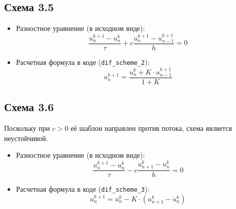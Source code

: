 \subsection{Схема 3.5}

\begin{itemize}
    \item[] {Разностное уравнение (в исходном виде):}
    \begin{equation*}
        \frac{u_{n}^{k+1} - u_{n}^{k}}{\tau} + c \frac{u_{n}^{k+1} - u_{n-1}^{k+1}}{h} = 0
    \end{equation*}
    
    \item[] {Расчетная формула в коде (\texttt{dif\_scheme\_2}):}
    \begin{equation*}
        u_{n}^{k+1} = \frac{u_{n}^{k} + K \cdot u_{n-1}^{k+1}}{1 + K}
    \end{equation*}
\end{itemize}

\subsection{Схема 3.6}
Поскольку при $c > 0$ её шаблон направлен против потока, схема является  неустойчивой.

\begin{itemize}
    \item[] {Разностное уравнение (в исходном виде):}
    \begin{equation*}
        \frac{u_{n}^{k+1} - u_{n}^{k}}{\tau} - c \frac{u_{n+1}^{k} - u_{n}^{k}}{h} = 0
    \end{equation*}
    
    \item[] {Расчетная формула в коде (\texttt{dif\_scheme\_3}):}
    \begin{equation*}
        u_{n}^{k+1} = u_{n}^{k} - K \cdot (u_{n+1}^{k} - u_{n}^{k})
    \end{equation*}
\end{itemize}


